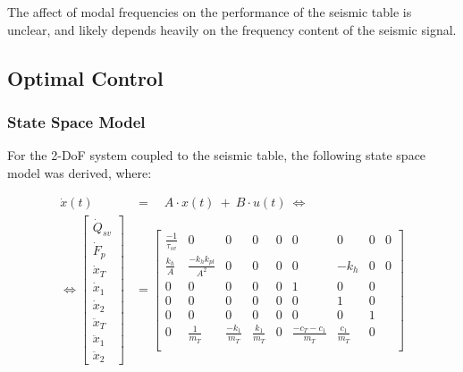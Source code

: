 \documentclass[10pt]{extarticle}
\begin{document}
The affect of modal frequencies on the performance of the seismic table is unclear, and likely depends heavily on the frequency content of the seismic signal.


\clearpage
\subsection{Optimal Control}  

\subsubsection{ State Space Model } \label{section_ss_model}
For the 2-DoF system coupled to the seismic table, the following state space model was derived, where:

\begin{align}
    \dot{x}(t) \enspace &=  \quad A \cdot x(t) \ + \ B \cdot u(t) \ \Longleftrightarrow \nonumber \\
    \Longleftrightarrow 
    \begin{bmatrix} 
        \dot{Q}_{sv} \\[6pt]
        \dot{F}_p \\[6pt]
        \dot{x}_T \\[6pt]
        \dot{x}_1 \\[6pt]
        \dot{x}_2 \\[6pt]
        \ddot{x}_T \\[6pt]
        \ddot{x}_1 \\[6pt]
        \ddot{x}_2 
    \end{bmatrix} &=
    \begin{bmatrix}
    \frac{-1}{\tau_{sv}} &  0 & 0 & 0 & 0 & 0 & 0 & 0 & 0\\[6pt]
    \frac{k_h}{A}  & \frac{- k_h k_{pl}}{A^2} & 0              & 0 & 0                & 0   & -k_h & 0               & 0 \\[6pt]
                    0 &               0              & 0 & 0                & 0   & 1    & 0               & 0 \\[6pt]
                    0 &               0              & 0 & 0                & 0   & 0    & 1               & 0 \\[6pt]
                    0 &               0              & 0 & 0                & 0   & 0    & 0               & 1 \\[6pt]
                    0 &                \frac{1}{m_T} & \frac{-k_1}{m_T} & \frac{k_1}{m_T}     &  0              & \frac{-c_T - c_1 }{m_T} & \frac{ c_1 }{m_T}   & 0               \\[6pt]

\end{bmatrix}
\end{align}
\end{document}
